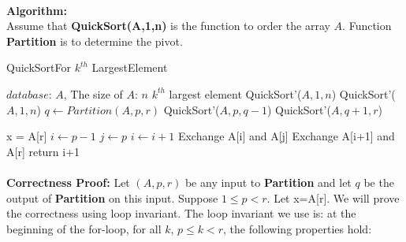 \documentclass[11pt]{article}
\begin{document}
\begin{CJK*}{UTF8}{gkai}


    \paragraph{}\textbf{Algorithm:}\\
    Assume that \textbf{QuickSort(A,1,n)} is the function to order the array $A$. Function \textbf{Partition} is to determine the pivot.
    \begin{algorithm}
        \caption{QuickSortFor $ k^{th} $ LargestElement}
        \begin{algorithmic}[1] %
            \Require $database$: $A$, \qquad The size of $A$: $n$
            \Ensure $ k^{th} $ largest element
                \State QuickSort'($A,1,n$)
                \vspace{3mm}
                \State QuickSort'($A,1,n$)
                    \State $q \gets Partition(A,p,r)$
                \EndIf
                \State QuickSort'($A,p,q-1$)
                \State QuickSort'($A,q+1,r$)
            \EndFunction
            \State

                \State x = A[r]
                \State $i\gets p-1$
                \State $j\gets p$
                        \State $i \gets i+1$
                        \State Exchange A[i] and A[j]
                    \Else
                    \EndIf
                    \State Exchange A[i+1] and A[r]
                \EndFor
                \State return i+1
            \EndFunction
        \end{algorithmic}
    \end{algorithm}

\paragraph{}\textbf{Correctness Proof:}
    Let $(A,p,r)$ be any input to \textbf{Partition} and let $q$ be the output of \textbf{Partition} on this input. Suppose $1 \leq p < r$. Let x=A[r]. We will
prove the correctness using loop invariant. The loop invariant we use is: at the beginning of the for-loop, for all $k$, $p \leq k < r$, the following properties hold:


\end{CJK*}
\end{document}

